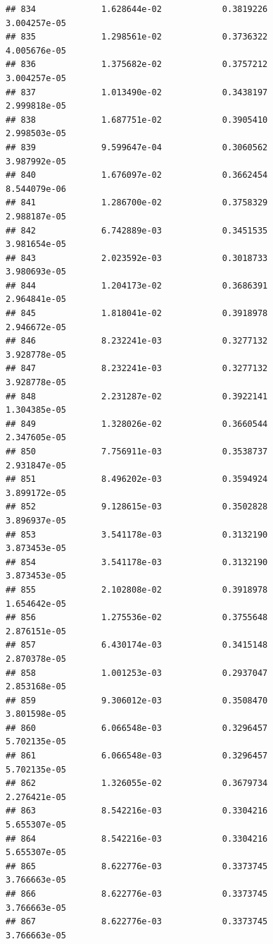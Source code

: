 \documentclass[
]{article}
\begin{document}
\begin{verbatim}
## 834             1.628644e-02            0.3819226            3.004257e-05
## 835             1.298561e-02            0.3736322            4.005676e-05
## 836             1.375682e-02            0.3757212            3.004257e-05
## 837             1.013490e-02            0.3438197            2.999818e-05
## 838             1.687751e-02            0.3905410            2.998503e-05
## 839             9.599647e-04            0.3060562            3.987992e-05
## 840             1.676097e-02            0.3662454            8.544079e-06
## 841             1.286700e-02            0.3758329            2.988187e-05
## 842             6.742889e-03            0.3451535            3.981654e-05
## 843             2.023592e-03            0.3018733            3.980693e-05
## 844             1.204173e-02            0.3686391            2.964841e-05
## 845             1.818041e-02            0.3918978            2.946672e-05
## 846             8.232241e-03            0.3277132            3.928778e-05
## 847             8.232241e-03            0.3277132            3.928778e-05
## 848             2.231287e-02            0.3922141            1.304385e-05
## 849             1.328026e-02            0.3660544            2.347605e-05
## 850             7.756911e-03            0.3538737            2.931847e-05
## 851             8.496202e-03            0.3594924            3.899172e-05
## 852             9.128615e-03            0.3502828            3.896937e-05
## 853             3.541178e-03            0.3132190            3.873453e-05
## 854             3.541178e-03            0.3132190            3.873453e-05
## 855             2.102808e-02            0.3918978            1.654642e-05
## 856             1.275536e-02            0.3755648            2.876151e-05
## 857             6.430174e-03            0.3415148            2.870378e-05
## 858             1.001253e-03            0.2937047            2.853168e-05
## 859             9.306012e-03            0.3508470            3.801598e-05
## 860             6.066548e-03            0.3296457            5.702135e-05
## 861             6.066548e-03            0.3296457            5.702135e-05
## 862             1.326055e-02            0.3679734            2.276421e-05
## 863             8.542216e-03            0.3304216            5.655307e-05
## 864             8.542216e-03            0.3304216            5.655307e-05
## 865             8.622776e-03            0.3373745            3.766663e-05
## 866             8.622776e-03            0.3373745            3.766663e-05
## 867             8.622776e-03            0.3373745            3.766663e-05

\end{verbatim}
\end{document}
